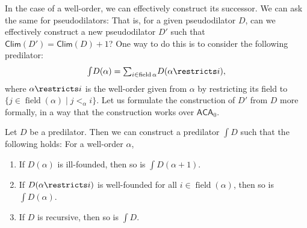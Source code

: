 \documentclass{mhkr}
\newcommand{\field}{\operatorname{field}}
\newcommand{\Clim}{\mathsf{Clim}}
\newcommand{\ACA}{\mathsf{ACA}}
\begin{document}
In the case of a well-order, we can effectively construct its successor. We can ask the same for pseudodilators: That is, for a given pseudodilator $D$, can we effectively construct a new pseudodilator $D'$ such that $\Clim(D') = \Clim(D)+1$? One way to do this is to consider the following predilator:
\begin{equation*}
    {\textstyle\int}D(\alpha) = {\textstyle \sum}_{i\in\field \alpha} D(\alpha\restricts i),
\end{equation*}
where $\alpha\restricts i$ is the well-order given from $\alpha$ by restricting its field to $\{j\in\field(\alpha)\mid j<_\alpha i\}$.
Let us formulate the construction of $D'$ from $D$ more formally, in a way that the construction works over $\ACA_0$.
\begin{lemma}[$\ACA_0$] \label{Lemma: The successor pseudodilator}
    Let $D$ be a predilator. Then we can construct a predilator $\int D$ such that the following holds: For a well-order $\alpha$,
    \begin{enumerate}
        \item If $D(\alpha)$ is ill-founded, then so is $\int D(\alpha+1)$.
        \item If $D(\alpha\restricts i)$ is well-founded for all $i\in\field(\alpha)$, then so is $\int D(\alpha)$.
        \item If $D$ is recursive, then so is $\int D$.
    \end{enumerate}
\end{lemma}
\end{document}
